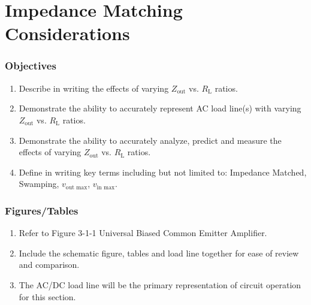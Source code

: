 \documentclass[main.tex]{subfiles}
\begin{document}
\section{Impedance Matching Considerations}
\label{sec:ImpedanceSection}

\subsubsection*{Objectives}
\begin{enumerate}
    \item Describe in writing the effects of varying $Z_{\text{out}}$ vs. $R_{\text{L}}$ ratios.
    \item Demonstrate the ability to accurately represent AC load line(s) with varying $Z_{\text{out}}$ vs. $R_{\text{L}}$ ratios.
    \item Demonstrate the ability to accurately analyze, predict and measure the effects of varying $Z_{\text{out}}$ vs. $R_{\text{L}}$ ratios.
    \item Define in writing key terms including but not limited to: Impedance Matched, Swamping, $v_{\text{out max}}$, $v_{\text{in max}}$.
\end{enumerate}

\subsubsection*{Figures/Tables}
\begin{enumerate}
    \item Refer to Figure 3-1-1 Universal Biased Common Emitter Amplifier.
    \item Include the schematic figure, tables and load line together for ease of review and comparison.
  \item The AC/DC load line will be the primary representation of circuit operation for this section.
\end{enumerate}

\end{document}
